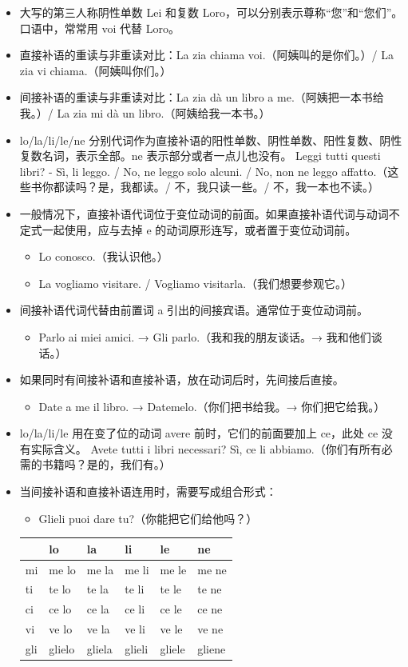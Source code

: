 \documentclass[UTF8,a4paper,titlepage,10pt]{report}
\begin{document}
\begin{enumerate}
\begin{itemize}
\item 大写的第三人称阴性单数 Lei 和复数 Loro，可以分别表示尊称“您”和“您们”。口语中，常常用 voi 代替 Loro。
\item 直接补语的重读与非重读对比：La zia chiama voi.（阿姨叫的是你们。）/ La zia vi chiama.（阿姨叫你们。）
\item 间接补语的重读与非重读对比：La zia dà un libro a me.（阿姨把一本书给我。）/ La zia mi dà un libro.（阿姨给我一本书。）
\item lo/la/li/le/ne 分别代词作为直接补语的阳性单数、阴性单数、阳性复数、阴性复数名词，表示全部。ne 表示部分或者一点儿也没有。
Leggi tutti questi libri? - Sì, li leggo. / No, ne leggo solo alcuni. / No, non ne leggo affatto.（这些书你都读吗？是，我都读。/ 不，我只读一些。/ 不，我一本也不读。）
\item 一般情况下，直接补语代词位于变位动词的前面。如果直接补语代词与动词不定式一起使用，应与去掉 e 的动词原形连写，或者置于变位动词前。
\begin{itemize}
\item Lo conosco.（我认识他。）
\item La vogliamo visitare. / Vogliamo visitarla.（我们想要参观它。）
\end{itemize}
\item 间接补语代词代替由前置词 a 引出的间接宾语。通常位于变位动词前。
\begin{itemize}
\item Parlo ai miei amici. → Gli parlo.（我和我的朋友谈话。→ 我和他们谈话。）
\end{itemize}
\item 如果同时有间接补语和直接补语，放在动词后时，先间接后直接。
\begin{itemize}
\item Date a me il libro. → Datemelo.（你们把书给我。→ 你们把它给我。）
\end{itemize}
\item lo/la/li/le 用在变了位的动词 avere 前时，它们的前面要加上 ce，此处 ce 没有实际含义。
Avete tutti i libri necessari? Sì, ce li abbiamo.（你们有所有必需的书籍吗？是的，我们有。）
\item 当间接补语和直接补语连用时，需要写成组合形式：
\begin{itemize}
\item Glieli puoi dare tu?（你能把它们给他吗？）
\end{itemize}
\begin{center}
\begin{tabular}{llllll}
 & lo & la & li & le & ne\\
\hline
mi & me lo & me la & me li & me le & me ne\\
ti & te lo & te la & te li & te le & te ne\\
ci & ce lo & ce la & ce li & ce le & ce ne\\
vi & ve lo & ve la & ve li & ve le & ve ne\\
gli & glielo & gliela & glieli & gliele & gliene\\
\end{tabular}
\end{center}
\end{itemize}
\end{enumerate}
\end{document}
